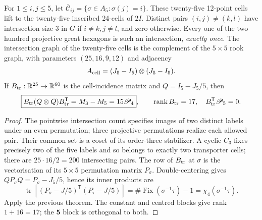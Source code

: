 \documentclass[11pt]{article}
\begin{document}
\begin{proposition}
\label{p1:prop:v340-transporter-hexagon-intersection}
For $1\le i,j\le5$, let
$\overline{\mathcal C}_{ij}=\{\sigma\in A_5:\sigma(j)=i\}$.
These twenty-five 12-point cells lift to the twenty-five inscribed
24-cells of $2I$. Distinct pairs $(i,j)\ne(k,l)$ have intersection
size $3$ in $G$ if $i\ne k,j\ne l$, and zero otherwise. Every one of
the two hundred projective great hexagons is such an intersection,
\emph{exactly once}. The intersection graph of the twenty-five cells
is the complement of the $5\times5$ rook graph, with parameters
$(25,16,9,12)$ and adjacency
\[
 A_{\rm cell}=(J_5-I_5)\otimes(J_5-I_5).
\]
If $B_{\rm tr}:\mathbb R^{25}\to\mathbb R^{60}$ is the cell-incidence
matrix and $Q=I_5-J_5/5$, then
\[
 \boxed{B_{\rm tr}(Q\otimes Q)B_{\rm tr}^{\mathsf T}=M_3-M_5
 =15\mathscr P_4},\qquad
 \operatorname{rank}B_{\rm tr}=17,\quad
 B_{\rm tr}^{\mathsf T}\mathscr P_5=0.
\]
\end{proposition}
\begin{proof}
The pointwise intersection count specifies images of two distinct
labels under an even permutation; three projective permutations
realize each allowed pair. Their common set is a coset of its
order-three stabilizer. A cyclic $C_3$ fixes precisely two of the
five labels and so belongs to exactly two transporter cells; there
are $25\cdot16/2=200$ intersecting pairs. The row of
$B_{\rm tr}$ at $\sigma$ is the vectorisation of its $5\times5$
permutation matrix $P_\sigma$. Double-centering gives
$QP_\sigma Q=P_\sigma-J_5/5$, hence its inner products are
\[
\operatorname{tr}[(P_\sigma-J/5)^{\mathsf T}
(P_\tau-J/5)]=\#\operatorname{Fix}(\sigma^{-1}\tau)-1
=\chi_4(\sigma^{-1}\tau).
\]
Apply the previous theorem. The constant and centred blocks give
rank $1+16=17$; the $\mathbf5$ block is orthogonal to both.
\end{proof}
\end{document}

